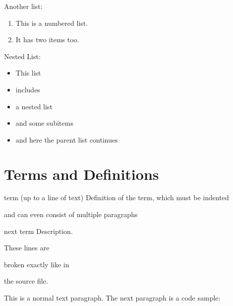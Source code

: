 \documentclass[letterpaper,10pt,english]{sphinxmanual}
\begin{document}
Another list:
\begin{enumerate}
\item {} 
This is a numbered list.

\item {} 
It has two items too.

\end{enumerate}

Nested List:
\begin{itemize}
\item {} 
This list

\item {} 
includes

\item {} 
a nested list

\item {} 
and some subitems

\item {} 
and here the parent list continues

\end{itemize}


\section{Terms and Definitions}
\label{\detokenize{textformating:terms-and-definitions}}
term (up to a line of text)
Definition of the term, which must be indented

and can even consist of multiple paragraphs

next term
Description.

\begin{DUlineblock}{0em}
\item[] These lines are
\item[] broken exactly like in
\item[] the source file.
\item[] 
\end{DUlineblock}

This is a normal text paragraph. The next paragraph is a code sample:

%
\begin{sphinxVerbatim}[commandchars=\\\{\}]
       
    
\end{sphinxVerbatim}
\end{document}
